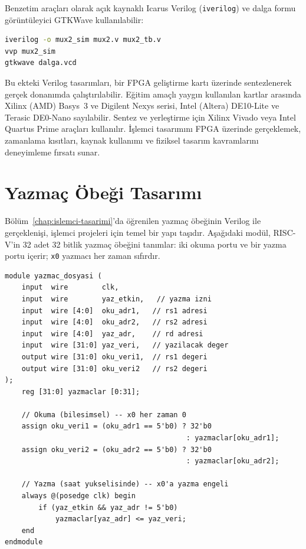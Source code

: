 Benzetim araçları olarak açık kaynaklı Icarus Verilog (\texttt{iverilog}) ve dalga formu görüntüleyici GTKWave kullanılabilir:

\begin{lstlisting}[language=bash, numbers=none, caption={Icarus Verilog ile benzetim}]
iverilog -o mux2_sim mux2.v mux2_tb.v
vvp mux2_sim
gtkwave dalga.vcd
\end{lstlisting}

\begin{bilginot}
Bu ekteki Verilog tasarımları, bir FPGA geliştirme kartı üzerinde sentezlenerek gerçek donanımda çalıştırılabilir. Eğitim amaçlı yaygın kullanılan kartlar arasında Xilinx (AMD) Basys~3 ve Digilent Nexys serisi, Intel (Altera) DE10-Lite ve Terasic DE0-Nano sayılabilir. Sentez ve yerleştirme için Xilinx Vivado veya Intel Quartus Prime araçları kullanılır. İşlemci tasarımını FPGA üzerinde gerçeklemek, zamanlama kısıtları, kaynak kullanımı ve fiziksel tasarım kavramlarını deneyimleme fırsatı sunar.
\end{bilginot}


\section{Yazmaç Öbeği Tasarımı}
\label{sec:ekd-yazmac-dosyasi}

Bölüm~\ref{chap:islemci-tasarimi}'da öğrenilen yazmaç öbeğinin Verilog ile gerçeklenişi, işlemci projeleri için temel bir yapı taşıdır. Aşağıdaki modül, RISC-V'in 32 adet 32 bitlik yazmaç öbeğini tanımlar: iki okuma portu ve bir yazma portu içerir; \texttt{x0} yazmacı her zaman sıfırdır.

\begin{lstlisting}[style=verilog, caption={RISC-V yazmaç öbeği (32$\times$32)}, label={lst:ekd-yazmac}]
module yazmac_dosyasi (
    input  wire        clk,
    input  wire        yaz_etkin,   // yazma izni
    input  wire [4:0]  oku_adr1,   // rs1 adresi
    input  wire [4:0]  oku_adr2,   // rs2 adresi
    input  wire [4:0]  yaz_adr,    // rd adresi
    input  wire [31:0] yaz_veri,   // yazilacak deger
    output wire [31:0] oku_veri1,  // rs1 degeri
    output wire [31:0] oku_veri2   // rs2 degeri
);
    reg [31:0] yazmaclar [0:31];

    // Okuma (bilesimsel) -- x0 her zaman 0
    assign oku_veri1 = (oku_adr1 == 5'b0) ? 32'b0
                                           : yazmaclar[oku_adr1];
    assign oku_veri2 = (oku_adr2 == 5'b0) ? 32'b0
                                           : yazmaclar[oku_adr2];

    // Yazma (saat yukselisinde) -- x0'a yazma engeli
    always @(posedge clk) begin
        if (yaz_etkin && yaz_adr != 5'b0)
            yazmaclar[yaz_adr] <= yaz_veri;
    end
endmodule
\end{lstlisting}

